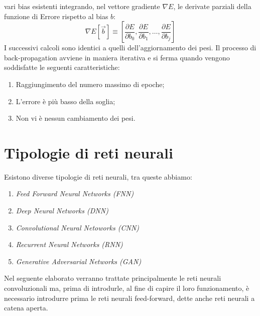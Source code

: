 vari bias esistenti integrando, nel vettore gradiente $\nabla{E}$, le derivate parziali della 
funzione di Errore rispetto al bias $b$:
\begin{equation}\label{gradient vector with bias}
    \nabla{E}[\vec{b}]\equiv\left[\frac{\partial E}{\partial b_{0}}, \frac{\partial E}{\partial b_{1}}, \dots, \frac{\partial E}{\partial b_{j}}\right]
\end{equation}
I successivi calcoli sono identici a quelli dell'aggiornamento dei pesi. Il processo 
di back-propagation avviene in maniera iterativa e si ferma quando vengono 
soddisfatte le seguenti caratteristiche:
\begin{enumerate}
    \item Raggiungimento del numero massimo di epoche;
    \item L'errore è più basso della soglia;
    \item Non vi è nessun cambiamento dei pesi.
\end{enumerate}

\section{Tipologie di reti neurali}
Esistono diverse tipologie di reti neurali, tra queste abbiamo:
\begin{enumerate}
    \item \emph{Feed Forward Neural Networks (FNN)}
    \item \emph{Deep Neural Networks (DNN)}
    \item \emph{Convolutional Neural Netoworks (CNN)}
    \item \emph{Recurrent Neural Networks (RNN)}
    \item \emph{Generative Adversarial Networks (GAN)}
\end{enumerate}
Nel seguente elaborato verranno trattate principalmente le reti neurali 
convoluzionali ma, prima di introdurle, al fine di capire il loro funzionamento, 
è necessario introdurre prima le reti neurali feed-forward, dette anche reti 
neurali a catena aperta.

